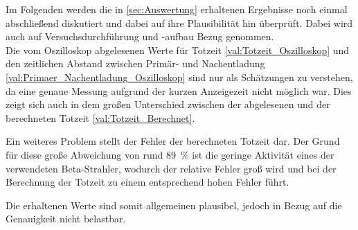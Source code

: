 Im Folgenden werden die in \cref{sec:Auswertung} erhaltenen Ergebnisse noch einmal 
abschließend diskutiert und dabei auf ihre Plausibilität hin überprüft.
Dabei wird auch auf Versuchsdurchführung und -aufbau Bezug genommen.\\


Die vom Oszilloskop abgelesenen Werte für Totzeit \cref{val:Totzeit_Oszilloskop} und den zeitlichen Abstand
zwischen Primär- und Nachentladung \cref{val:Primaer_Nachentladung_Oszilloskop} sind nur als
Schätzungen zu verstehen, da eine genaue Messung aufgrund der kurzen Anzeigezeit nicht möglich war.
Dies zeigt sich auch in dem großen Unterschied zwischen der abgelesenen und der berechneten 
Totzeit \cref{val:Totzeit_Berechnet}. 

Ein weiteres Problem stellt der Fehler der berechneten Totzeit dar.
Der Grund für diese große Abweichung von rund \SI{89}{\percent}
ist die geringe Aktivität eines der verwendeten Beta-Strahler, wodurch 
der relative Fehler groß wird und bei der Berechnung der Totzeit zu einem entsprechend
hohen Fehler führt.

Die erhaltenen Werte sind somit allgemeinen plausibel, jedoch in Bezug auf die Genauigkeit nicht belastbar.  
  